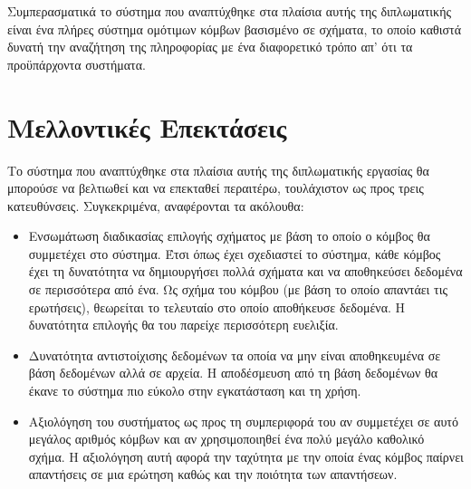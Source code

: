 Συμπερασματικά το σύστημα που αναπτύχθηκε στα πλαίσια αυτής της
διπλωματικής είναι ένα πλήρες σύστημα ομότιμων κόμβων βασισμένο σε
σχήματα, το οποίο καθιστά δυνατή την αναζήτηση της πληροφορίας με
ένα διαφορετικό τρόπο απ' ότι τα προϋπάρχοντα  συστήματα.

\section{Μελλοντικές Επεκτάσεις}
Το σύστημα που αναπτύχθηκε στα πλαίσια αυτής της διπλωματικής
εργασίας θα μπορούσε να βελτιωθεί και να επεκταθεί περαιτέρω,
τουλάχιστον ως προς τρεις κατευθύνσεις. Συγκεκριμένα, αναφέρονται
τα ακόλουθα:

\begin{itemize}
\item Ενσωμάτωση διαδικασίας επιλογής σχήματος με βάση το οποίο ο
κόμβος θα συμμετέχει στο σύστημα. Έτσι όπως έχει σχεδιαστεί το
σύστημα, κάθε κόμβος έχει τη δυνατότητα να δημιουργήσει πολλά
σχήματα και να αποθηκεύσει δεδομένα σε περισσότερα από ένα. Ως
σχήμα του κόμβου (με βάση το οποίο απαντάει τις ερωτήσεις),
θεωρείται το τελευταίο στο οποίο αποθήκευσε δεδομένα. Η δυνατότητα
επιλογής θα του παρείχε περισσότερη ευελιξία.
\item Δυνατότητα αντιστοίχισης δεδομένων τα οποία να μην είναι
αποθηκευμένα σε βάση δεδομένων αλλά σε αρχεία. Η αποδέσμευση από
τη βάση δεδομένων θα έκανε το σύστημα πιο εύκολο στην εγκατάσταση
και τη χρήση.
\item Αξιολόγηση του συστήματος ως προς τη συμπεριφορά του αν
συμμετέχει σε αυτό μεγάλος αριθμός κόμβων  και αν χρησιμοποιηθεί ένα πολύ μεγάλο καθολικό σχήμα. H
αξιολόγηση αυτή αφορά την ταχύτητα με την οποία ένας κόμβος
παίρνει απαντήσεις σε μια ερώτηση καθώς και την ποιότητα των
απαντήσεων.
\end{itemize}